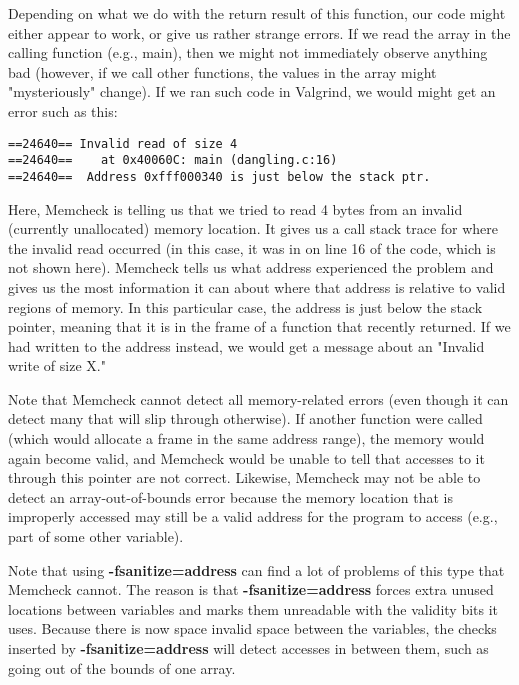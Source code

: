 \documentclass[11pt, a4paper]{article}
\begin{document}
Depending on what we do with the return result of this function, our code might either appear to work, or give us rather strange errors. If we read the array in the calling function (e.g., main), then we might not immediately observe anything bad (however, if we call other functions, the values in the array might "mysteriously" change). If we ran such code in Valgrind, we would might get an error such as this:

\begin{verbatim}
==24640== Invalid read of size 4
==24640==    at 0x40060C: main (dangling.c:16)
==24640==  Address 0xfff000340 is just below the stack ptr.
\end{verbatim}



Here, Memcheck is telling us that we tried to read 4 bytes from an invalid (currently unallocated) memory location. It gives us a call stack trace for where the invalid read occurred (in this case, it was in on line 16 of the code, which is not shown here). Memcheck tells us what address experienced the problem and gives us the most information it can about where that address is relative to valid regions of memory. In this particular case, the address is just below the stack pointer, meaning that it is in the frame of a function that recently returned. If we had written to the address instead, we would get a message about an "Invalid write of size X."

Note that Memcheck cannot detect all memory-related errors (even though it can detect many that will slip through otherwise). If another function were called (which would allocate a frame in the same address range), the memory would again become valid, and Memcheck would be unable to tell that accesses to it through this pointer are not correct. Likewise, Memcheck may not be able to detect an array-out-of-bounds error because the memory location that is improperly accessed may still be a valid address for the program to access (e.g., part of some other variable).

Note that using \textbf{-fsanitize=address} can find a lot of problems of this type that Memcheck cannot. The reason is that \textbf{-fsanitize=address} forces extra unused locations between variables and marks them unreadable with the validity bits it uses. Because there is now space invalid space between the variables, the checks inserted by \textbf{-fsanitize=address} will detect accesses in between them, such as going out of the bounds of one array.
\end{document}
